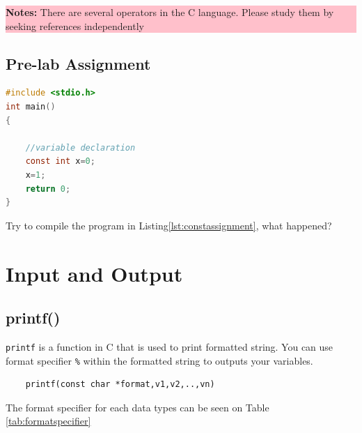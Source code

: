\begin{center}
	\colorbox{pink}{\parbox{0.8\linewidth}{\textbf{Notes:} There are several operators in the C language. Please study them by seeking references independently}}
\end{center}
\subsection{Pre-lab Assignment}
\begin{lstlisting}[language=c,caption=Using assignment operator in a const variable,label=lst:constassignment,captionpos=t]
#include <stdio.h>
int main()
{

	//variable declaration
    const int x=0;
    x=1;
	return 0;
}
\end{lstlisting} 
Try to compile the program in Listing\ref{lst:constassignment}, what happened?


\section{Input and Output}

\subsection{printf()}
\verb*|printf| is a function in C that is used to print formatted string.  You can use format specifier \verb*|%| within the formatted string to outputs your variables.

\begin{verbatim}
	printf(const char *format,v1,v2,..,vn)
\end{verbatim}

The format specifier for each data types can be seen on Table \ref{tab:formatspecifier}



